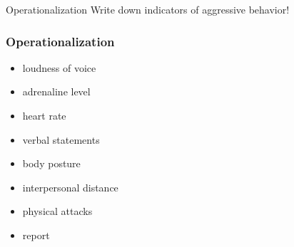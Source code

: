\documentclass[]{beamer}
\begin{document}


\begin{frame}
\begin{exampleblock}{Operationalization}
Write down indicators of aggressive behavior!
\end{exampleblock}
\end{frame}

\begin{frame}
\frametitle{Operationalization}
\begin{itemize}
\item loudness of voice
\item adrenaline level
\item heart rate
\item verbal statements
\item body posture
\item interpersonal distance
\item physical attacks
\item report 
\end{itemize}
\end{frame}
\end{document}

